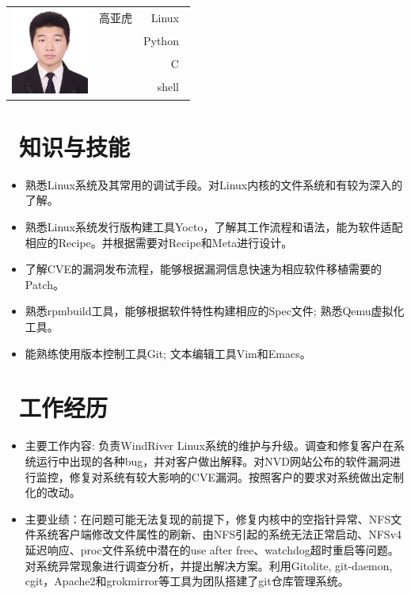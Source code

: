 \documentclass{resume}
\begin{document}
\Large{
  \begin{tabu}{ c l r }
     & \scshape{高亚虎} & {Linux~} \\
    &  & {Python~} \\
    &  & {C~} \\
    &  & {shell~}
  \end{tabu}
}
\section{\faGraduationCap\ 知识与技能}\normalsize
\begin{itemize}
  \item {熟悉Linux系统及其常用的调试手段。对Linux内核的文件系统和有较为深入的了解。}
  \item {熟悉Linux系统发行版构建工具Yocto，了解其工作流程和语法，能为软件适配相应的Recipe。并根据需要对Recipe和Meta进行设计。}
  \item {了解CVE的漏洞发布流程，能够根据漏洞信息快速为相应软件移植需要的Patch。}
  \item {熟悉rpmbuild工具，能够根据软件特性构建相应的Spec文件; 熟悉Qemu虚拟化工具。}
  \item {能熟练使用版本控制工具Git; 文本编辑工具Vim和Emacs。}
  \end{itemize}

\section{\faUsers\ 工作经历}\normalsize
{}
\begin{itemize}
  \item {主要工作内容: 负责WindRiver Linux系统的维护与升级。调查和修复客户在系统运行中出现的各种bug，并对客户做出解释。对NVD网站公布的软件漏洞进行监控，修复对系统有较大影响的CVE漏洞。按照客户的要求对系统做出定制化的改动。}
\item {主要业绩：在问题可能无法复现的前提下，修复内核中的空指针异常、NFS文件系统客户端修改文件属性的刷新、由NFS引起的系统无法正常启动、NFSv4延迟响应、proc文件系统中潜在的use after free、watchdog超时重启等问题。对系统异常现象进行调查分析，并提出解决方案。利用Gitolite, git-daemon, cgit，Apache2和grokmirror等工具为团队搭建了git仓库管理系统。}
  \end{itemize}
\end{document}
